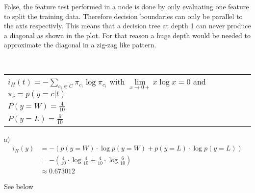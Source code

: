 %
%
%
\begin{flushleft}
False, the feature test performed in a node is done by only evaluating one feature to split the training data. Therefore decision boundaries can only be parallel to the axis respectivly. This means that a decision tree at depth 1 can never produce a diagonal as shown in the plot. For that reason a huge depth would be needed to approximate the diagonal in a zig-zag like pattern.
\end{flushleft}
%
%
%
\\
\begin{table}[!h]
\begin{tabular}{ll}
  $i_H(t) = - \sum_{c_i \in C} \pi_{c_i} \log \pi_{c_i}$ with $\underset{x\rightarrow 0+}{\lim} x\log x = 0$ and $\pi_c = p(y=c|t)$ \\
  $P(y=W) = \frac{4}{10}$ \\
  $P(y=L) = \frac{6}{10}$
\end{tabular}
\end{table}
\begin{flushleft}
  a) 
  \begin{align*}
    i_H(y) &= - (p(y=W) \cdot \log p(y=W) + p(y=L) \cdot \log p(y=L)) \\
    &= -(\frac{4}{10} \cdot \log \frac{4}{10} + \frac{4}{10} \cdot \log \frac{6}{10}) \\
    &\approx 0.673012
  \end{align*}
\end{flushleft}
%
%
%
 See below
%

%



